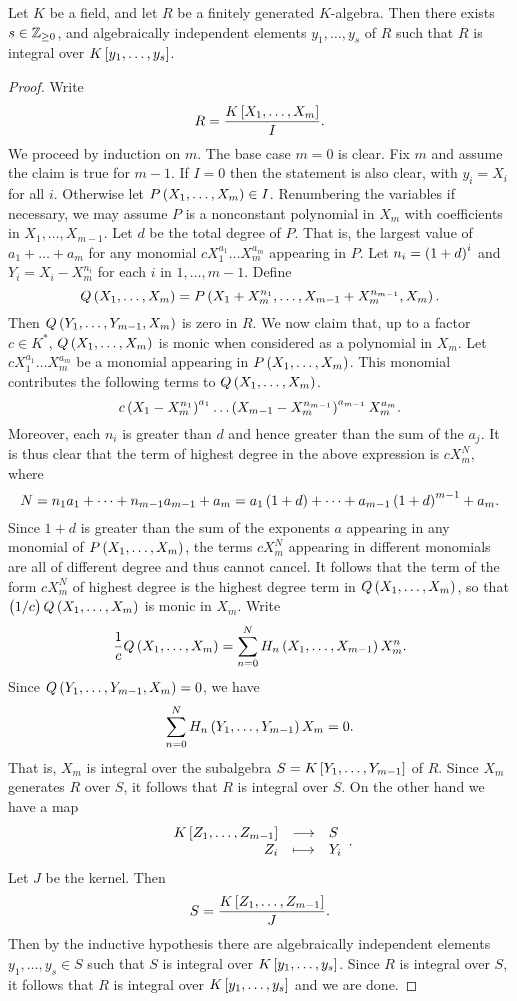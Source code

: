 \begin{proposition}
Let $ K $ be a field, and let $ R $ be a finitely generated $ K $-algebra. Then there exists $ s \in \mathbb{Z}_{\ge 0} $, and algebraically independent elements $ y_1, \dots, y_s $ of $ R $ such that $ R $ is integral over $ K\sbr{y_1, \dots, y_s} $.
\end{proposition}

\begin{proof}
Write
$$ R = \dfrac{K\sbr{X_1, \dots, X_m}}{I}. $$
We proceed by induction on $ m $. The base case $ m = 0 $ is clear. Fix $ m $ and assume the claim is true for $ m - 1 $. If $ I = 0 $ then the statement is also clear, with $ y_i = X_i $ for all $ i $. Otherwise let $ P\br{X_1, \dots, X_m} \in I $. Renumbering the variables if necessary, we may assume $ P $ is a nonconstant polynomial in $ X_m $ with coefficients in $ X_1, \dots, X_{m - 1} $. Let $ d $ be the total degree of $ P $. That is, the largest value of $ a_1 + \dots + a_m $ for any monomial $ cX_1^{a_1} \dots X_m^{a_m} $ appearing in $ P $. Let $ n_i = \br{1 + d}^i $ and $ Y_i = X_i - X_m^{n_i} $ for each $ i $ in $ 1, \dots, m - 1 $. Define
$$ Q\br{X_1, \dots, X_m} = P\br{X_1 + X_m^{n_1}, \dots, X_{m - 1} + X_m^{n_{m - 1}}, X_m}. $$
Then $ Q\br{Y_1, \dots, Y_{m - 1}, X_m} $ is zero in $ R $. We now claim that, up to a factor $ c \in K^* $, $ Q\br{X_1, \dots, X_m} $ is monic when considered as a polynomial in $ X_m $. Let $ cX_1^{a_1} \dots X_m^{a_m} $ be a monomial appearing in $ P\br{X_1, \dots, X_m} $. This monomial contributes the following terms to $ Q\br{X_1, \dots, X_m} $.
$$ c\br{X_1 - X_m^{n_1}}^{a_1} \dots \br{X_{m - 1} - X_m^{n_{m - 1}}}^{a_{m - 1}}X_m^{a_m}. $$
Moreover, each $ n_i $ is greater than $ d $ and hence greater than the sum of the $ a_j $. It is thus clear that the term of highest degree in the above expression is $ cX_m^N $, where
$$ N = n_1a_1 + \dots + n_{m - 1}a_{m - 1} + a_m = a_1\br{1 + d} + \dots + a_{m - 1}\br{1 + d}^{m - 1} + a_m. $$
Since $ 1 + d $ is greater than the sum of the exponents $ a $ appearing in any monomial of $ P\br{X_1, \dots, X_m} $, the terms $ cX_m^N $ appearing in different monomials are all of different degree and thus cannot cancel. It follows that the term of the form $ cX_m^N $ of highest degree is the highest degree term in $ Q\br{X_1, \dots, X_m} $, so that $ \br{1 / c}Q\br{X_1, \dots, X_m} $ is monic in $ X_m $. Write
$$ \dfrac{1}{c}Q\br{X_1, \dots, X_m} = \sum_{n = 0}^N H_n\br{X_1, \dots, X_{m - 1}}X_m^n. $$
Since $ Q\br{Y_1, \dots, Y_{m - 1}, X_m} = 0 $, we have
$$ \sum_{n = 0}^N H_n\br{Y_1, \dots, Y_{m - 1}}X_m = 0. $$
That is, $ X_m $ is integral over the subalgebra $ S = K\sbr{Y_1, \dots, Y_{m - 1}} $ of $ R $. Since $ X_m $ generates $ R $ over $ S $, it follows that $ R $ is integral over $ S $. On the other hand we have a map
$$ \function{K\sbr{Z_1, \dots, Z_{m - 1}}}{S}{Z_i}{Y_i}. $$
Let $ J $ be the kernel. Then
$$ S = \dfrac{K\sbr{Z_1, \dots, Z_{m - 1}}}{J}. $$
Then by the inductive hypothesis there are algebraically independent elements $ y_1, \dots, y_s \in S $ such that $ S $ is integral over $ K\sbr{y_1, \dots, y_s} $. Since $ R $ is integral over $ S $, it follows that $ R $ is integral over $ K\sbr{y_1, \dots, y_s} $ and we are done.
\end{proof}
